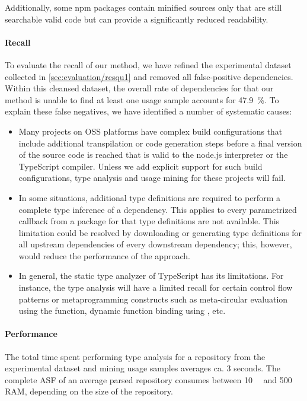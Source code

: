 Additionally, some npm packages contain minified sources only that are still searchable valid code but can provide a significantly reduced readability.

\paragraph{Recall}
\label{sec:evaluation/resqu2/recall}

To evaluate the recall of our method, we have refined the experimental dataset collected in \cref{sec:evaluation/resqu1} and removed all false-positive dependencies.
Within this cleansed dataset, the overall rate of dependencies for that our method is unable to find at least one usage sample accounts for \SI{47.9}{\percent}.
To explain these false negatives, we have identified a number of systematic causes:

\begin{itemize}
	\item Many projects on OSS platforms have complex build configurations that include additional transpilation or code generation steps before a final version of the source code is reached that is valid to the node.js interpreter or the TypeScript compiler.
		Unless we add explicit support for such build configurations, type analysis and usage mining for these projects will fail.
	\item In some situations, additional type definitions are required to perform a complete type inference of a dependency.
		This applies to every parametrized callback from a package for that type definitions are not available.
		This limitation could be resolved by downloading or generating type definitions for all upstream dependencies of every downstream dependency; this, however, would reduce the performance of the approach.
	\item In general, the static type analyzer of TypeScript has its limitations.
		For instance, the type analysis will have a limited recall for certain control flow patterns or metaprogramming constructs such as meta-circular evaluation using the  function, dynamic function binding using , etc.
\end{itemize}

\paragraph{Performance}
\label{sec:evaluation/resqu2/performance}

The total time spent performing type analysis for a repository from the experimental dataset and mining usage samples averages ca. \num{3} seconds.
The complete ASF of an average parsed repository consumes between \SI{10}{\mega\byte} and \SI{500}{\mega\byte} RAM, depending on the size of the repository.

